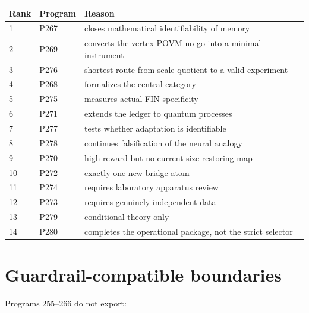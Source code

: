 \documentclass[11pt,a4paper,openany]{report}
\begin{document}
\begin{center}
\begingroup\small
\setlength{\tabcolsep}{2.5pt}
\renewcommand{\arraystretch}{1.16}
\begin{longtable}{@{}p{}p{}p{}@{}}
\toprule
\textbf{Rank} & \textbf{Program} & \textbf{Reason} \\
\midrule
\endhead
1 & P267 & closes mathematical identifiability of memory \\
2 & P269 & converts the vertex-POVM no-go into a minimal instrument \\
3 & P276 & shortest route from scale quotient to a valid experiment \\
4 & P268 & formalizes the central category \\
5 & P275 & measures actual FIN specificity \\
6 & P271 & extends the ledger to quantum processes \\
7 & P277 & tests whether adaptation is identifiable \\
8 & P278 & continues falsification of the neural analogy \\
9 & P270 & high reward but no current size-restoring map \\
10 & P272 & exactly one new bridge atom \\
11 & P274 & requires laboratory apparatus review \\
12 & P273 & requires genuinely independent data \\
13 & P279 & conditional theory only \\
14 & P280 & completes the operational package, not the strict selector \\
\bottomrule
\end{longtable}
\endgroup
\end{center}

\chapter{Guardrail-compatible boundaries}

Programs 255--266 do not export:
\end{document}
